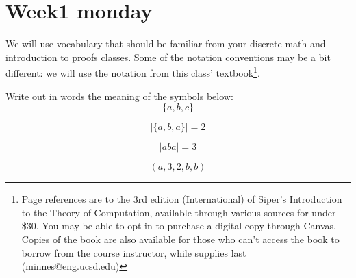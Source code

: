 \documentclass[12pt, oneside]{article}
\begin{document}
\begin{flushright}
\end{flushright} \section*{Week1 monday}


We will use vocabulary that should be familiar from your discrete 
math and introduction to proofs classes.  Some of the notation conventions may 
be a bit different: we will use the notation from this class' textbook\footnote{Page references are to 
the 3rd edition (International) of Siper's Introduction to the Theory of Computation,
available through various sources for under \$30. You may be able to 
opt in to purchase a digital copy through Canvas. Copies of the book are also available 
for those who can't access the book
to borrow from the course instructor, while supplies last (minnes@eng.ucsd.edu)}.

Write out in words the meaning of the symbols below: 
\[
    \{ a,b, c\}
\]

\phantom{The set whose elements are $a$, $b$, and $c$}

\[
    | \{a, b, a \} | = 2
\]


\[
    | aba | = 3
\]

\phantom{The length of the string $aba$ is $3$.}

\[
    (a, 3, 2, b, b)
\]

\phantom{The $5$-tuple whose first components is $a$, second component 
is $3$, third component is $2$, fourth component is $b$, and fifth component is $b$.}
\end{document}
